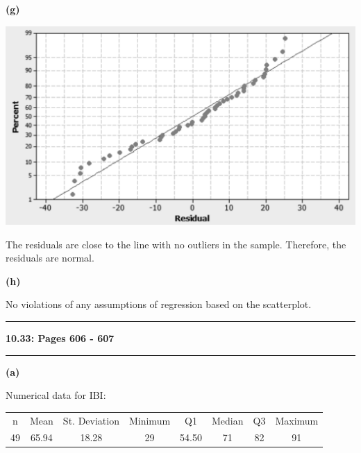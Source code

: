\documentclass[11pt]{article}
\newcommand\question[2]{\vspace{.25in}\hrule\textbf{#1: #2}\vspace{.5em}\hrule\vspace{.10in}}
\renewcommand\part[1]{\vspace{.10in}\textbf{(#1)}\par}
\begin{document}
	\part{g}
		\begin{center}
			\includegraphics[scale=0.5]{images/ah.png}
		\end{center}\par
		The residuals are close to the line with no outliers in the sample. Therefore, the residuals are normal.\par
	
	\part{h}
		No violations of any assumptions of regression based on the scatterplot.\par
	

\question{10.33}{Pages 606 - 607}
	\part{a}
		Numerical data for IBI:\par
		
		\begin{center}
		\begin{tabular}{cccccccc}
			n & Mean & St. Deviation & Minimum & Q1 & Median & Q3 & Maximum\\
			49 & 65.94 & 18.28 & 29 & 54.50 & 71 & 82 & 91\\
		\end{tabular}\par
		\end{center}
		
\end{document}
